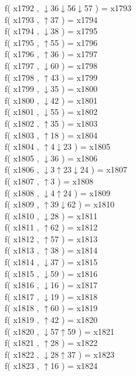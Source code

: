 f( x1792 , $\downarrow$36$\downarrow$56$\downarrow$57 ) = x1793 \\
f( x1793 , $\uparrow$37 ) = x1794 \\
f( x1794 , $\downarrow$38 ) = x1795 \\
f( x1795 , $\uparrow$55 ) = x1796 \\
f( x1796 , $\uparrow$36 ) = x1797 \\
f( x1797 , $\downarrow$60 ) = x1798 \\
f( x1798 , $\uparrow$43 ) = x1799 \\
f( x1799 , $\downarrow$35 ) = x1800 \\
f( x1800 , $\downarrow$42 ) = x1801 \\
f( x1801 , $\downarrow$55 ) = x1802 \\
f( x1802 , $\uparrow$35 ) = x1803 \\
f( x1803 , $\uparrow$18 ) = x1804 \\
f( x1804 , $\uparrow$4$\downarrow$23 ) = x1805 \\
f( x1805 , $\downarrow$36 ) = x1806 \\
f( x1806 , $\downarrow$3$\uparrow$23$\downarrow$24 ) = x1807 \\
f( x1807 , $\uparrow$3 ) = x1808 \\
f( x1808 , $\downarrow$4$\uparrow$24 ) = x1809 \\
f( x1809 , $\uparrow$39$\downarrow$62 ) = x1810 \\
f( x1810 , $\downarrow$28 ) = x1811 \\
f( x1811 , $\uparrow$62 ) = x1812 \\
f( x1812 , $\uparrow$57 ) = x1813 \\
f( x1813 , $\uparrow$38 ) = x1814 \\
f( x1814 , $\downarrow$37 ) = x1815 \\
f( x1815 , $\downarrow$59 ) = x1816 \\
f( x1816 , $\downarrow$16 ) = x1817 \\
f( x1817 , $\downarrow$19 ) = x1818 \\
f( x1818 , $\uparrow$60 ) = x1819 \\
f( x1819 , $\uparrow$42 ) = x1820 \\
f( x1820 , $\downarrow$57$\uparrow$59 ) = x1821 \\
f( x1821 , $\uparrow$28 ) = x1822 \\
f( x1822 , $\downarrow$28$\uparrow$37 ) = x1823 \\
f( x1823 , $\uparrow$16 ) = x1824 \\
